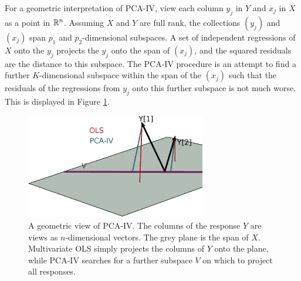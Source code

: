 \documentclass[14pt]{extarticle}
\begin{document}
For a geometric interpretation of PCA-IV, view each column $y_{j}$ in $Y$ and
$x_{j}$ in $X$ as a point in $\mathbb{R}^{n}$. Assuming $X$ and $Y$ are full rank,
the collections $\left(y_{j}\right)$ and $\left(x_{j}\right)$ span $p_{1}$ and
$p_{2}$-dimensional subspaces. A set of independent regressions of $X$ onto the
$y_{j}$ projects the $y_{j}$ onto the span of $\left(x_{j}\right)$, and the
squared residuals are the distance to this subspace. The PCA-IV procedure is an
attempt to find a further $K$-dimensional subspace within the span of the
$\left(x_{j}\right)$ such that the residuals of the regressions from $y_j$ onto
this further subspace is not much worse. This is displayed in Figure
\ref{fig:pca_iv_geometry}.

\begin{figure}
  \centering
  \includegraphics[width=0.7\textwidth]{figure/pca_iv/pca_iv_geometry}
  \caption{A geometric view of PCA-IV. The columns of the response $Y$ are views
    as $n$-dimensional vectors. The grey plane is the span of
    $X$. Multivariate OLS simply projects the columns of $Y$ onto the plane,
    while PCA-IV searches for a further subspace $V$ on which to project all
    responses. \label{fig:pca_iv_geometry} }
\end{figure}
\end{document}
